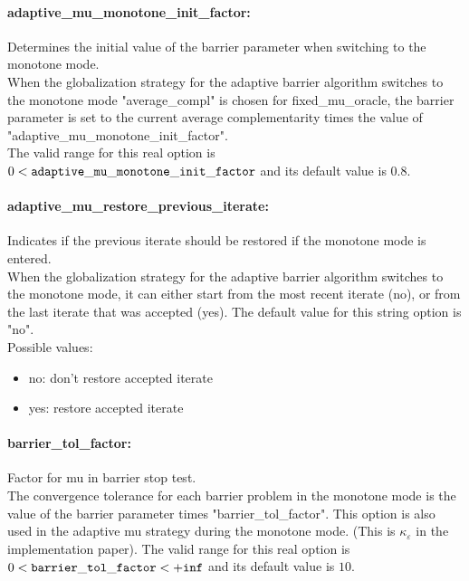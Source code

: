 \paragraph{adaptive\_mu\_monotone\_init\_factor:}\label{sec:adaptive_mu_monotone_init_factor} Determines the initial value of the barrier parameter when switching to the monotone mode. $\;$ \\
 When the globalization strategy for the adaptive
barrier algorithm switches to the monotone mode
"average\_compl" is chosen for fixed\_mu\_oracle, the barrier parameter is set to
the current average complementarity times the
value of "adaptive\_mu\_monotone\_init\_factor".\\ The valid range for this real option is 
$0 <  {\tt adaptive\_mu\_monotone\_init\_factor }$
and its default value is $0.8$.


\paragraph{adaptive\_mu\_restore\_previous\_iterate:}\label{sec:adaptive_mu_restore_previous_iterate} Indicates if the previous iterate should be restored if the monotone mode is entered. $\;$ \\
 When the globalization strategy for the adaptive
barrier algorithm switches to the monotone mode,
it can either start from the most recent iterate
(no), or from the last iterate that was accepted
(yes).
The default value for this string option is "no".
\\ 
Possible values:
\begin{itemize}
   \item no: don't restore accepted iterate
   \item yes: restore accepted iterate
\end{itemize}

\paragraph{barrier\_tol\_factor:}\label{sec:barrier_tol_factor} Factor for mu in barrier stop test. $\;$ \\
 The convergence tolerance for each barrier
problem in the monotone mode is the value of the
barrier parameter times "barrier\_tol\_factor".
This option is also used in the adaptive mu
strategy during the monotone mode. (This is
$\kappa_\varepsilon$ in the implementation paper). The valid range for this real option is 
$0 <  {\tt barrier\_tol\_factor } <  {\tt +inf}$
and its default value is $10$.


